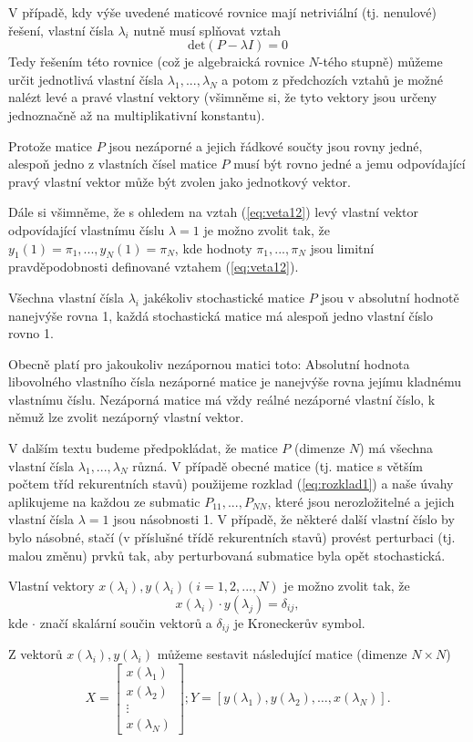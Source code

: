 \documentclass[10pt]{article}
\begin{document}
V případě, kdy výše uvedené maticové rovnice mají netriviální (tj. nenulové) řešení, vlastní čísla $\lambda_i$ nutně musí splňovat vztah $$\text{det}(P-\lambda I)= 0$$ Tedy řešením této rovnice (což je algebraická rovnice $N$-tého stupně) můžeme určit jednotlivá vlastní čísla $\lambda_1, ... , \lambda_N$ a potom z předchozích vztahů je možné nalézt levé a pravé vlastní vektory (všimněme si, že tyto vektory jsou určeny jednoznačně až na multiplikativní konstantu).

Protože matice $P$ jsou nezáporné a jejich řádkové součty jsou rovny jedné, alespoň jedno z vlastních čísel matice $P$ musí být rovno jedné a jemu odpovídající pravý vlastní vektor může být zvolen jako jednotkový vektor.

Dále si všimněme, že s ohledem na vztah (\ref{eq:veta12}) levý vlastní vektor odpovídající vlastnímu číslu $\lambda = 1$ je možno zvolit tak, že $y_1(1) = \pi_1,...,y_N(1) = \pi_N$, kde hodnoty $\pi_1,...,\pi_N$ jsou limitní pravděpodobnosti definované vztahem (\ref{eq:veta12}).

Všechna vlastní čísla $\lambda_i$ jakékoliv stochastické matice $P$ jsou v absolutní hodnotě nanejvýše rovna 1, každá stochastická matice má alespoň jedno vlastní číslo rovno 1.

Obecně platí pro jakoukoliv nezápornou matici toto: Absolutní hodnota libovolného vlastního čísla nezáporné matice je nanejvýše rovna jejímu kladnému vlastnímu číslu. Nezáporná matice má vždy reálné nezáporné vlastní číslo, k němuž lze zvolit nezáporný vlastní vektor.

V dalším textu budeme předpokládat, že matice $P$ (dimenze $N$) má všechna vlastní čísla $\lambda_1,...,\lambda_N$ různá. V případě obecné matice (tj. matice s větším počtem tříd rekurentních stavů) použijeme rozklad (\ref{eq:rozklad1}) a naše úvahy aplikujeme na každou ze submatic $P_{11},...,P_{NN}$, které jsou nerozložitelné a jejich vlastní čísla $\lambda = 1$ jsou násobnosti 1. V případě, že některé další vlastní číslo by bylo násobné, stačí (v příslušné třídě rekurentních stavů) provést perturbaci (tj. malou změnu) prvků tak, aby perturbovaná submatice byla opět stochastická.

Vlastní vektory $x(\lambda_i), y(\lambda_i) (i=1,2,...,N)$ je možno zvolit tak, že $$x(\lambda_i) \cdot y(\lambda_j) = \delta_{ij},$$ kde $\cdot$ značí skalární součin vektorů a $\delta_{ij}$ je Kroneckerův symbol.

Z vektorů $x(\lambda_i), y(\lambda_i)$ můžeme sestavit následující matice (dimenze $N \times N$)
\begin{equation*}
X = \begin{bmatrix}
x(\lambda_1)\\
x(\lambda_2)\\
\vdots\\
x(\lambda_N)
\end{bmatrix};
Y=[y(\lambda_1),y(\lambda_2),\dots,x(\lambda_N)]
.\end{equation*}
\end{document}
